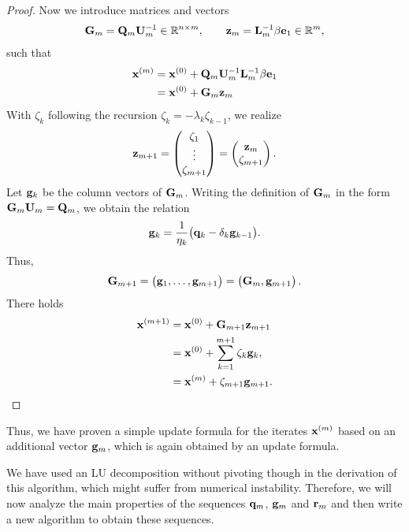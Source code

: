 \begin{proof}
  Now we introduce matrices and vectors
  \begin{gather}
    \mathbf G_m = \mathbf Q_m \mathbf U_m^{-1} \in \mathbb R^{n\times m},
    \qquad \mathbf z_m = \mathbf L_m^{-1} \beta \mathbf e_1\in \mathbb R^m,
  \end{gather}
  such that
  \begin{align}
    \mathbf x^{(m)}
    &= \mathbf x^{(0)} + \mathbf Q_m \mathbf U_m^{-1} \mathbf L_m^{-1} \beta \mathbf e_1\\
    &= \mathbf x^{(0)} + \mathbf G_m \mathbf z_m
  \end{align}
  With $\zeta_k$ following the recursion
  $\zeta_k = - \lambda_k \zeta_{k-1}$, we realize
  \begin{gather}
    \mathbf z_{m+1} =
    \begin{pmatrix}
      \zeta_1\\\vdots\\\zeta_{m+1}
    \end{pmatrix}
    =
    \begin{pmatrix}
      \mathbf z_{m}\\\zeta_{m+1}
    \end{pmatrix}.
  \end{gather}
  Let $\mathbf g_k$ be the column vectors of $\mathbf G_m$. Writing the
  definition of $\mathbf G_m$ in the form $\mathbf G_m \mathbf U_m = \mathbf Q_m$, we
  obtain the relation
  \begin{gather}
    \label{eq:nla:krylov:lanczos-p}
    \mathbf g_k = \frac1{\eta_k}\bigl(\mathbf q_k - \delta_k \mathbf g_{k-1}\bigr).
  \end{gather}
  Thus,
  \begin{gather}
    \mathbf G_{m+1} =
    \begin{pmatrix}
      \mathbf g_1,\dots,\mathbf g_{m+1}
    \end{pmatrix}
    =
    \begin{pmatrix}
      \mathbf G_{m},\mathbf g_{m+1}
    \end{pmatrix}.
  \end{gather}
  There holds
  \begin{align}
    \mathbf x^{(m+1)}
    &= \mathbf x^{(0)} + \mathbf G_{m+1}\mathbf z_{m+1}\\
    &= \mathbf x^{(0)} + \sum_{k=1}^{m+1} \zeta_k \mathbf g_k,\\
    &= \mathbf x^{(m)} + \zeta_{m+1} \mathbf g_{m+1}.
  \end{align}
\end{proof}

\begin{remark}
  Thus, we have proven a simple update formula for the iterates
  $\mathbf x^{(m)}$ based on an additional vector $\mathbf g_m$, which is again
  obtained by an update formula.

  We have used an LU decomposition without pivoting though in the
  derivation of this algorithm, which might suffer from numerical
  instability. Therefore, we will now analyze the main properties of
  the sequences $\mathbf q_m$, $\mathbf g_m$ and $\mathbf r_m$ and then write a new
  algorithm to obtain these sequences.
\end{remark}

